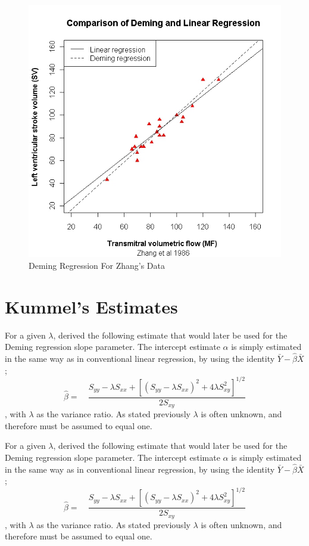 \documentclass[12pt, a4paper]{report}
\theoremstyle{plain}
\theoremstyle{definition}
\theoremstyle{remark}
\begin{document}
\begin{figure}[h!]
	\includegraphics[width=130mm]{images/ZhangDeming.jpeg}
	\caption{Deming Regression For Zhang's Data}\label{ZhangDeming}
\end{figure}


\newpage



\section{Kummel's Estimates}
For a given $\lambda$, \citet{Kummel} derived the following estimate that would later be used for the Deming regression slope
parameter. The intercept estimate $\alpha$ is simply estimated in the same way as in conventional linear
regression, by using the identity $\bar{Y}-\hat{\beta}\bar{X}$;
\begin{equation}
	\hat{\beta} =\quad \frac{S_{yy} - \lambda S_{xx}+[(S_{yy} -
		\lambda S_{xx})^{2}+ 4\lambda S^{2}_{xy}]^{1/2}}{2S_{xy}}
\end{equation},
with $\lambda$ as the variance ratio. As stated previously $\lambda$ is often unknown, and therefore must be assumed to equal one. 

For a given $\lambda$, \citet{Kummel} derived the following estimate that would later be used for the Deming regression slope
parameter. The intercept estimate $\alpha$ is simply estimated in the same way as in conventional linear
regression, by using the identity $\bar{Y}-\hat{\beta}\bar{X}$;
\begin{equation}
	\hat{\beta} =\quad \frac{S_{yy} - \lambda S_{xx}+[(S_{yy} -
		\lambda S_{xx})^{2}+ 4\lambda S^{2}_{xy}]^{1/2}}{2S_{xy}}
\end{equation},
with $\lambda$ as the variance ratio. As stated previously $\lambda$ is often unknown, and therefore must be assumed to equal one. 
\end{document}
